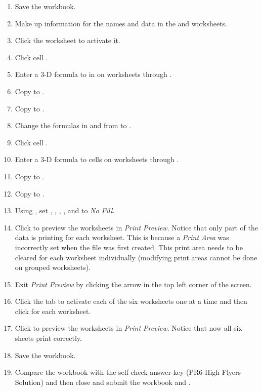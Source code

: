 \begin{enumerate}[resume]
	\item Save the  workbook.
	\item Make up information for the names and data in the  and  worksheets.
	\item Click the  worksheet to activate it.

	\item Click cell . 
	\item Enter a $ 3 $-D formula to  in  on worksheets  through . 
	\item Copy  to .
	\item Copy  to .
	\item Change the formulas in  and  from  to .
	\item Click cell . 
	\item Enter a $ 3 $-D formula to  cells  on worksheets  through . 
	\item Copy  to .
	\item Copy  to .
	\item Using , set , , , , and  to \textit{No Fill}. 
	\item Click  to preview the worksheets in \textit{Print Preview}. Notice that only part of the data is printing for each worksheet. This is because a \textit{Print Area} was incorrectly set when the file was first created. This print area needs to be cleared for each worksheet individually (modifying print areas cannot be done on grouped worksheets). 
	\item Exit \textit{Print Preview} by clicking the arrow in the top left corner of the screen. 
	\item Click the tab to activate each of the six worksheets one at a time and then click  for each worksheet.
	\item Click  to preview the worksheets in \textit{Print Preview}. Notice that now all six sheets print correctly.
	\item Save the  workbook.
	\item Compare the workbook with the self-check answer key (PR6-High Flyers Solution) and then close and submit the  workbook and .
\end{enumerate}

